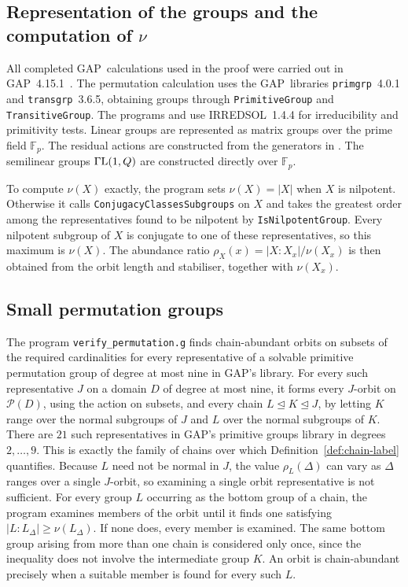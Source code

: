 \documentclass[10pt]{amsart}
\theoremstyle{definition}
\renewcommand{\ge}{\geqslant}
\newcommand{\GammaL}{\Gamma{\rm L}}
\newcommand{\pow}{\mathcal{P}}
\newcommand{\GAP}{\textsf{GAP}}
\numberwithin{equation}{section}
\numberwithin{table}{section}
\begin{document}
\subsection{Representation of the groups and the computation of \texorpdfstring{$\nu$}{nu}}
\label{sec:comp-nu}
\begin{sloppypar}
All completed \GAP\ calculations used in the proof were carried out in
\GAP~4.15.1~\cite{GAP4}.
The permutation calculation uses the \GAP\ libraries
\texttt{primgrp}~4.0.1 and \texttt{transgrp}~3.6.5, obtaining groups through
\texttt{PrimitiveGroup} and \texttt{TransitiveGroup}. The programs
 and  use
\textsf{IRREDSOL}~1.4.4 for irreducibility and primitivity tests. Linear groups are represented
as matrix groups over the prime field $\mathbb{F}_p$. The residual actions are
constructed from the generators in . The semilinear groups
$\GammaL(1,Q)$ are constructed directly over $\mathbb{F}_p$.

To compute $\nu(X)$ exactly, the program sets $\nu(X)=|X|$ when $X$ is
nilpotent. Otherwise it calls \texttt{ConjugacyClassesSubgroups} on $X$ and
takes the greatest order among the representatives found to be nilpotent by
\texttt{IsNilpotentGroup}. Every nilpotent subgroup of $X$ is conjugate to one
of these representatives, so this maximum is $\nu(X)$. The abundance ratio
$\rho_X(x)=|X:X_x|/\nu(X_x)$ is then obtained from the orbit length and
stabiliser, together with $\nu(X_x)$.
\end{sloppypar}

\subsection{Small permutation groups}
\label{sec:comp-perm}
The program \texttt{verify\_permutation.g} finds chain-abundant orbits on
subsets of the required cardinalities for every representative of a solvable
primitive permutation group of degree at most nine in \GAP{}'s library.
For every such representative $J$ on a
domain $D$ of degree at most nine, it forms every $J$-orbit on $\pow(D)$, using
the action on subsets, and every chain $L\trianglelefteq K\trianglelefteq J$,
by letting $K$ range over the normal subgroups of $J$ and $L$ over the normal
subgroups of $K$. There are $21$ such representatives in
\GAP{}'s primitive groups library in degrees $2,\ldots,9$. This is exactly the
family of chains over which
Definition~\ref{def:chain-label} quantifies.
Because $L$ need not be normal in $J$, the value $\rho_L(\Delta)$ can vary as
$\Delta$ ranges over a single $J$-orbit, so examining a single orbit
representative is not sufficient. For every group $L$ occurring as the bottom group of a
chain, the program examines members of the orbit until it finds one satisfying
$|L:L_\Delta|\ge\nu(L_\Delta)$. If none does, every member is examined. The
same bottom group arising from more than one chain is considered only once,
since the inequality does not involve the intermediate group $K$. An orbit is
chain-abundant precisely when a suitable member is found for every such $L$.
\end{document}
